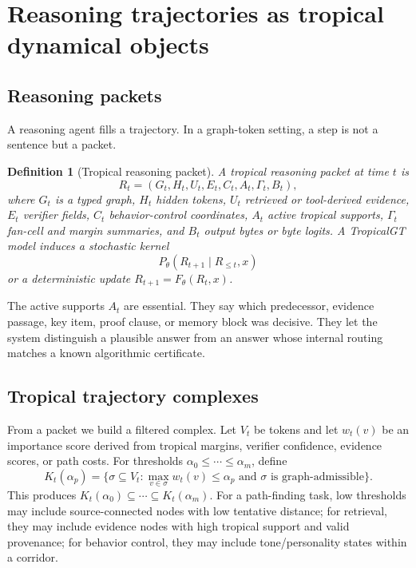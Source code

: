 \documentclass[11pt]{article}
\newtheorem{definition}{Definition}[section]
\begin{document}
\section{Reasoning trajectories as tropical dynamical objects}

\subsection{Reasoning packets}

A reasoning agent fills a trajectory.  In a graph-token setting, a step is not a sentence but a packet.

\begin{definition}[Tropical reasoning packet]
A tropical reasoning packet at time \(t\) is
\begin{equation}
R_t=(G_t,H_t,U_t,E_t,C_t,A_t,\Gamma_t,B_t),
\end{equation}
where \(G_t\) is a typed graph, \(H_t\) hidden tokens, \(U_t\) retrieved or tool-derived evidence, \(E_t\) verifier fields, \(C_t\) behavior-control coordinates, \(A_t\) active tropical supports, \(\Gamma_t\) fan-cell and margin summaries, and \(B_t\) output bytes or byte logits.  A TropicalGT model induces a stochastic kernel
\begin{equation}
P_\theta(R_{t+1}\mid R_{\le t},x)
\end{equation}
or a deterministic update \(R_{t+1}=F_\theta(R_t,x)\).
\end{definition}

The active supports \(A_t\) are essential.  They say which predecessor, evidence passage, key item, proof clause, or memory block was decisive.  They let the system distinguish a plausible answer from an answer whose internal routing matches a known algorithmic certificate.

\subsection{Tropical trajectory complexes}

From a packet we build a filtered complex.  Let \(V_t\) be tokens and let \(w_t(v)\) be an importance score derived from tropical margins, verifier confidence, evidence scores, or path costs.  For thresholds \(\alpha_0\le\cdots\le\alpha_m\), define
\begin{equation}
K_t(\alpha_p)=\{\sigma\subseteq V_t: \max_{v\in\sigma} w_t(v)\le \alpha_p \text{ and } \sigma \text{ is graph-admissible}\}.
\end{equation}
This produces \(K_t(\alpha_0)\subseteq\cdots\subseteq K_t(\alpha_m)\).  For a path-finding task, low thresholds may include source-connected nodes with low tentative distance; for retrieval, they may include evidence nodes with high tropical support and valid provenance; for behavior control, they may include tone/personality states within a corridor.
\end{document}
